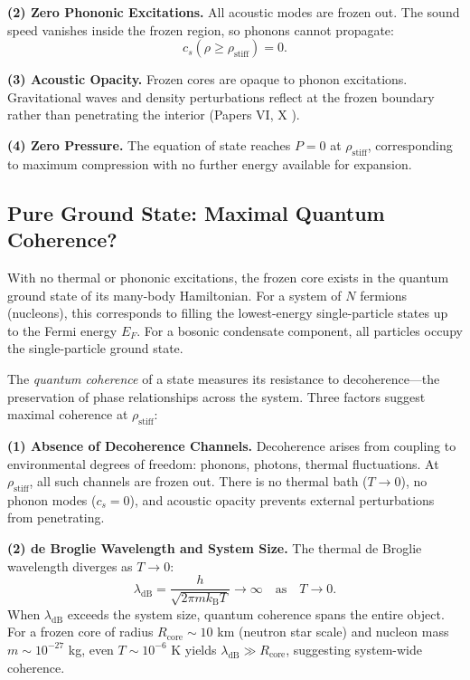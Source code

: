 \documentclass[11pt,a4paper]{article}
\newcommand{\kB}{\ensuremath{k_{\mathrm{B}}}}
\newcommand{\rhostiff}{\ensuremath{\rho_{\mathrm{stiff}}}}
\newcommand{\lambdadB}{\ensuremath{\lambda_{\mathrm{dB}}}}
\theoremstyle{definition}
\theoremstyle{remark}
\begin{document}
\textbf{(2) Zero Phononic Excitations.} All acoustic modes are frozen out. The sound speed vanishes inside the frozen region, so phonons cannot propagate:
\begin{equation}
\label{eq:frozen_phonons}
c_s(\rho \geq \rhostiff) = 0.
\end{equation}

\textbf{(3) Acoustic Opacity.} Frozen cores are opaque to phonon excitations. Gravitational waves and density perturbations reflect at the frozen boundary rather than penetrating the interior (Papers VI, X \cite{SkavbergGW2025,SkavbergFrozen2025}).

\textbf{(4) Zero Pressure.} The equation of state reaches $P = 0$ at $\rhostiff$, corresponding to maximum compression with no further energy available for expansion.

\subsection{Pure Ground State: Maximal Quantum Coherence?}
\label{sec:pure_ground_state}

With no thermal or phononic excitations, the frozen core exists in the quantum ground state of its many-body Hamiltonian. For a system of $N$ fermions (nucleons), this corresponds to filling the lowest-energy single-particle states up to the Fermi energy $E_F$. For a bosonic condensate component, all particles occupy the single-particle ground state.

The \emph{quantum coherence} of a state measures its resistance to decoherence---the preservation of phase relationships across the system. Three factors suggest maximal coherence at $\rhostiff$:

\textbf{(1) Absence of Decoherence Channels.} Decoherence arises from coupling to environmental degrees of freedom: phonons, photons, thermal fluctuations. At $\rhostiff$, all such channels are frozen out. There is no thermal bath ($T \to 0$), no phonon modes ($c_s = 0$), and acoustic opacity prevents external perturbations from penetrating.

\textbf{(2) de Broglie Wavelength and System Size.} The thermal de Broglie wavelength diverges as $T \to 0$:
\begin{equation}
\label{eq:deBroglie}
\lambdadB = \frac{h}{\sqrt{2\pi m \kB T}} \to \infty \quad \text{as} \quad T \to 0.
\end{equation}
When $\lambdadB$ exceeds the system size, quantum coherence spans the entire object. For a frozen core of radius $R_{\mathrm{core}} \sim 10$ km (neutron star scale) and nucleon mass $m \sim 10^{-27}$ kg, even $T \sim 10^{-6}$ K yields $\lambdadB \gg R_{\mathrm{core}}$, suggesting system-wide coherence.
\end{document}
